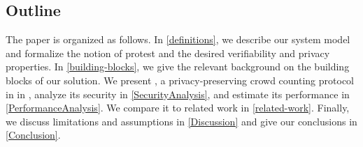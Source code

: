 \subsection{Outline}

The paper is organized as follows.
In \cref{definitions}, we describe our system model and formalize the notion of 
protest and the desired verifiability and privacy properties.
In \cref{building-blocks}, we give the relevant background on the building 
blocks of our solution.
%
%
We present \CROCUS, a privacy-preserving crowd counting 
protocol in in , analyze its security in \cref{SecurityAnalysis}, and estimate its performance in \cref{PerformanceAnalysis}.
We compare it to related work in \cref{related-work}.
Finally, we discuss limitations and assumptions in \cref{Discussion} and give 
our conclusions in \cref{Conclusion}.
